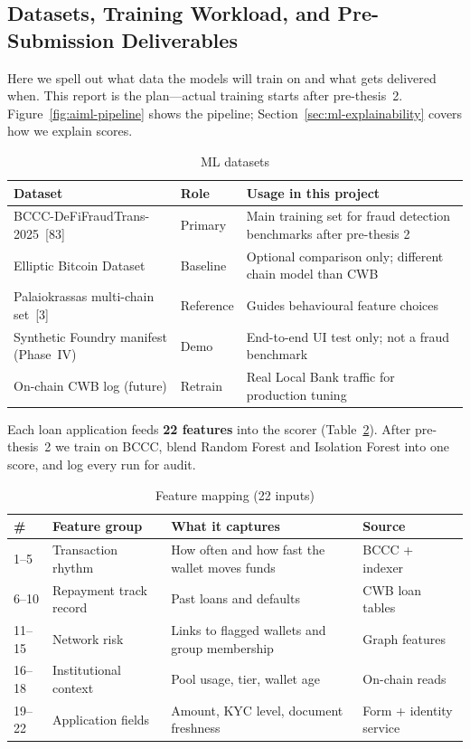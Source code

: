 \documentclass[12pt, a4paper]{report}
\newcommand{\tableheadcolor}{\rowcolor{TableHeadBg}}
\begin{document}
\subsection{Datasets, Training Workload, and Pre-Submission Deliverables}
\label{sec:ml-workload}

Here we spell out what data the models will train on and what gets delivered when. This report is the plan---actual training starts after pre-thesis~2. Figure~\ref{fig:aiml-pipeline} shows the pipeline; Section~\ref{sec:ml-explainability} covers how we explain scores.

\begin{table}[H]
\centering
\caption[ML datasets]{ML datasets}
\label{tab:ml-datasets}
\begin{tabular}{p{3.4cm}p{2.2cm}p{7.6cm}}
\toprule
\tableheadcolor
\textbf{Dataset} & \textbf{Role} & \textbf{Usage in this project} \\
\midrule
BCCC-DeFiFraudTrans-2025~[83] & Primary & Main training set for fraud detection benchmarks after pre-thesis 2 \\
Elliptic Bitcoin Dataset~ & Baseline & Optional comparison only; different chain model than CWB \\
Palaiokrassas multi-chain set~[3] & Reference & Guides behavioural feature choices \\
Synthetic Foundry manifest (Phase~IV) & Demo & End-to-end UI test only; not a fraud benchmark \\
On-chain CWB log (future) & Retrain & Real Local Bank traffic for production tuning \\
\bottomrule
\end{tabular}
\end{table}

Each loan application feeds \textbf{22 features} into the scorer (Table~\ref{tab:ml-feature-mapping}). After pre-thesis~2 we train on BCCC, blend Random Forest and Isolation Forest into one score, and log every run for audit.

\begin{table}[H]
\centering
\caption[Feature mapping (22 inputs)]{Feature mapping (22 inputs)}
\label{tab:ml-feature-mapping}
\footnotesize
\begin{tabular}{p{0.4cm}p{4.2cm}p{5.8cm}p{3.8cm}}
\toprule
\tableheadcolor
\textbf{\#} & \textbf{Feature group} & \textbf{What it captures} & \textbf{Source} \\
\midrule
1--5 & Transaction rhythm & How often and how fast the wallet moves funds & BCCC + indexer \\
6--10 & Repayment track record & Past loans and defaults & CWB loan tables \\
11--15 & Network risk & Links to flagged wallets and group membership & Graph features \\
16--18 & Institutional context & Pool usage, tier, wallet age & On-chain reads \\
19--22 & Application fields & Amount, KYC level, document freshness & Form + identity service \\
\bottomrule
\end{tabular}
\end{table}
\end{document}
